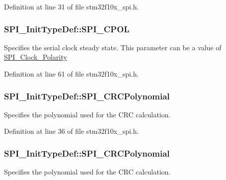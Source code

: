 Definition at line 31 of file stm32f10x\+\_\+spi.\+h.

\subsubsection[{\texorpdfstring{S\+P\+I\+\_\+\+C\+P\+OL}{SPI_CPOL}}]{ S\+P\+I\+\_\+\+Init\+Type\+Def\+::\+S\+P\+I\+\_\+\+C\+P\+OL}\hypertarget{struct_s_p_i___init_type_def_a1fe46794d91fd950e06da06b0e488997}{}\label{struct_s_p_i___init_type_def_a1fe46794d91fd950e06da06b0e488997}
Specifies the serial clock steady state. This parameter can be a value of \hyperlink{group___s_p_i___clock___polarity}{S\+P\+I\+\_\+\+Clock\+\_\+\+Polarity} 

Definition at line 61 of file stm32f10x\+\_\+spi.\+h.

\subsubsection[{\texorpdfstring{S\+P\+I\+\_\+\+C\+R\+C\+Polynomial}{SPI_CRCPolynomial}}]{ S\+P\+I\+\_\+\+Init\+Type\+Def\+::\+S\+P\+I\+\_\+\+C\+R\+C\+Polynomial}\hypertarget{struct_s_p_i___init_type_def_a0384b156f5b6aaf8a5ddd672df7de976}{}\label{struct_s_p_i___init_type_def_a0384b156f5b6aaf8a5ddd672df7de976}
Specifies the polynomial used for the C\+RC calculation. 

Definition at line 36 of file stm32f10x\+\_\+spi.\+h.

\subsubsection[{\texorpdfstring{S\+P\+I\+\_\+\+C\+R\+C\+Polynomial}{SPI_CRCPolynomial}}]{ S\+P\+I\+\_\+\+Init\+Type\+Def\+::\+S\+P\+I\+\_\+\+C\+R\+C\+Polynomial}\hypertarget{struct_s_p_i___init_type_def_aee6460416ade6c4016aac2bd64cae0eb}{}\label{struct_s_p_i___init_type_def_aee6460416ade6c4016aac2bd64cae0eb}
Specifies the polynomial used for the C\+RC calculation. 

